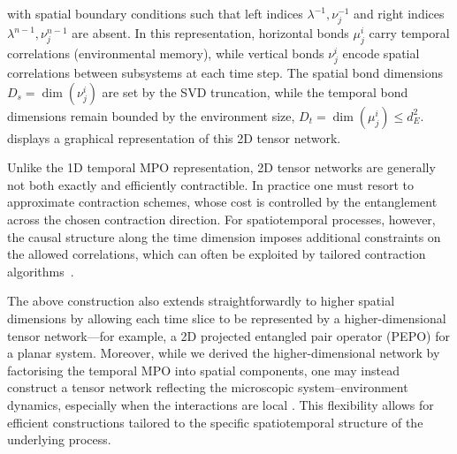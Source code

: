 with spatial boundary conditions such that left indices \(\lambda^{-1}, \nu^{-1}_j\) and right indices \(\lambda^{n-1}, \nu^{n-1}_j\) are absent. In this representation, horizontal bonds \(\mu_j^i\) carry temporal correlations (environmental memory), while vertical bonds \(\nu_j^i\) encode spatial correlations between subsystems at each time step. The spatial bond dimensions \(D_s = \dim(\nu_j^i)\) are set by the SVD truncation, while the temporal bond dimensions remain bounded by the environment size, \(D_t = \dim(\mu_j^i) \le d_E^2\).  displays a graphical representation of this 2D tensor network.

Unlike the 1D temporal MPO representation, 2D tensor networks are generally not both exactly 
and efficiently contractible. In practice one must resort to approximate contraction schemes, 
whose cost is controlled by the entanglement across the chosen contraction direction. For 
spatiotemporal processes, however, the causal structure along the time dimension imposes 
additional constraints on the allowed correlations, which can often be exploited by tailored 
contraction algorithms~\cite{jorgensenExploitingCausalTensor2019,keelingProcessTensorApproaches2025}.

The above construction also extends straightforwardly to higher spatial dimensions by allowing each time slice to be represented by a higher-dimensional tensor network---for example, a 2D projected entangled pair operator (PEPO) for a planar system. Moreover, while we derived the higher-dimensional network by factorising the temporal MPO into spatial components, one may instead construct a tensor network reflecting the microscopic system--environment dynamics, especially when the interactions are local \cite{whiteUnifyingNonMarkovianCharacterization2025,kobayashiTensornetworkDecodersProcess2024}. This flexibility allows for efficient constructions tailored to the specific spatiotemporal structure of the underlying process.
